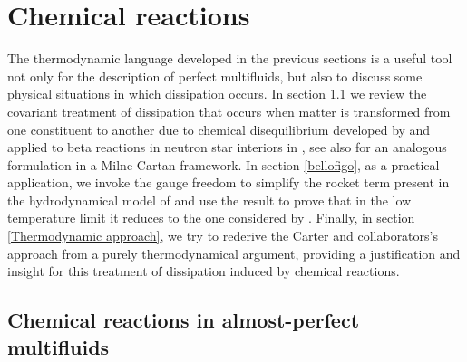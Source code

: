 \documentclass[usenatbib]{mnras}
\begin{document}
\section{Chemical reactions}

The thermodynamic language developed in the previous sections is a useful tool not only for the description of perfect multifluids, but also to discuss some physical situations in which dissipation occurs. In section \ref{Chemical reactions in almost-perfect multifluids} we review the covariant treatment of  dissipation that occurs when matter is transformed from one constituent to another due to chemical disequilibrium developed by \cite{carter1991RSPSA} and applied to beta reactions in neutron star interiors in \cite{langlois98}, see also \cite{carterXmilneXIII} for an analogous formulation in a Milne-Cartan framework. 
%
%
In section \ref{bellofigo}, as a practical application, we invoke the gauge freedom to simplify the rocket term present in the hydrodynamical model of \cite{langlois98} and use the result to prove that in the low temperature limit it reduces to the one considered by \cite{ColucciRocket2013}.
%
Finally, in section \ref{Thermodynamic approach}, we try to rederive the Carter and collaborators's  approach from a purely thermodynamical argument, providing a justification and insight for this treatment of dissipation induced by chemical reactions. 

%
%



\subsection{Chemical reactions in almost-perfect multifluids}
\label{Chemical reactions in almost-perfect multifluids}
\end{document}
